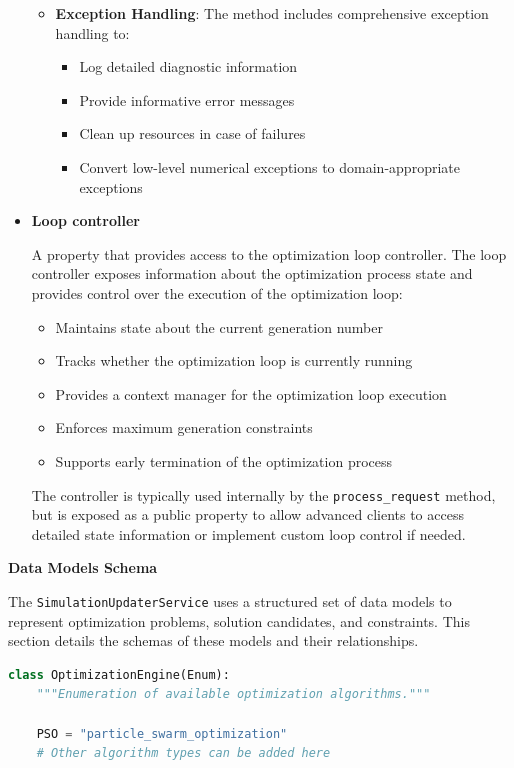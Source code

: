 \begin{itemize}
\begin{itemize}
		\item \textbf{Exception Handling}: The method includes comprehensive exception handling to:
		\begin{itemize}
			\item Log detailed diagnostic information
			\item Provide informative error messages
			\item Clean up resources in case of failures
			\item Convert low-level numerical exceptions to domain-appropriate exceptions
		\end{itemize}
	\end{itemize}

	\item \textbf{Loop controller}
	
	A property that provides access to the optimization loop controller. The loop controller exposes information about the optimization process state and provides control over the execution of the optimization loop:
	
	\begin{itemize}
		\item Maintains state about the current generation number
		\item Tracks whether the optimization loop is currently running
		\item Provides a context manager for the optimization loop execution
		\item Enforces maximum generation constraints
		\item Supports early termination of the optimization process
	\end{itemize}
	
	The controller is typically used internally by the \texttt{process\_request} method, but is exposed as a public property to allow advanced clients to access detailed state information or implement custom loop control if needed.
	
\end{itemize}

\textbf{Data Models Schema}

The \texttt{SimulationUpdaterService} uses a structured set of data models to represent optimization problems, solution candidates, and constraints. This section details the schemas of these models and their relationships.

\begin{lstlisting}[language=Python, caption={OptimizationEngine enumeration definition}]
	class OptimizationEngine(Enum):
	"""Enumeration of available optimization algorithms."""
	
	PSO = "particle_swarm_optimization"
	# Other algorithm types can be added here
\end{lstlisting}

